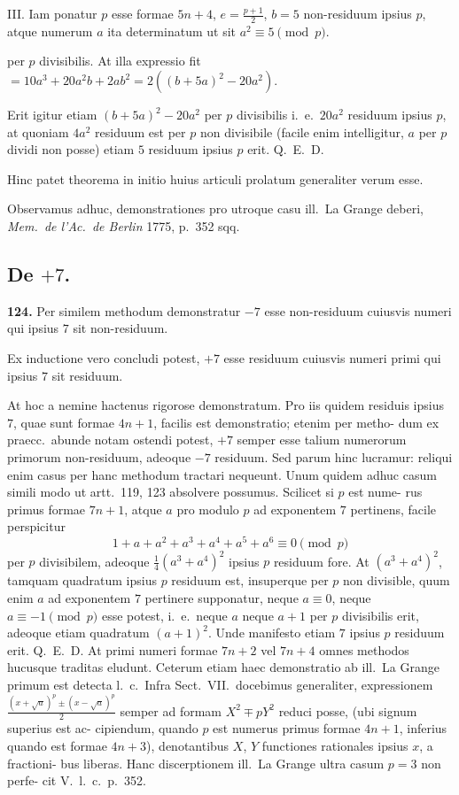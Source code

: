 \documentclass[12pt,a4paper]{article}
\begin{document}
III. Iam ponatur $p$ esse formae $5n+4$, $e = \frac{p+1}{2}$, $b = 5$ non-residuum ipsius
$p$, atque numerum $a$ ita determinatum ut sit $a^2 \equiv 5 \pmod{p}$.


per $p$ divisibilis. At illa expressio fit $= 10a^3 + 20a^2b + 2ab^2 = 2((b+5a)^2 - 20a^2)$.

Erit igitur etiam $(b+5a)^2 - 20a^2$ per $p$ divisibilis i.~e.\ $20a^2$ residuum ipsius
$p$, at quoniam $4a^2$ residuum est per $p$ non divisibile (facile enim intelligitur, $a$
per $p$ dividi non posse) etiam $5$ residuum ipsius $p$ erit. Q.~E.~D.

Hinc patet theorema in initio huius articuli prolatum generaliter verum
esse.

Observamus adhuc, demonstrationes pro utroque casu ill.\ La Grange deberi,
\textit{Mem.\ de l'Ac.\ de Berlin} 1775, p.~352 sqq.

\subsection*{De $+7$.}

\textbf{124.}
Per similem methodum demonstratur $-7$ esse non-residuum cuiusvis numeri qui ipsius $7$ sit non-residuum.

Ex inductione vero concludi potest, $+7$ esse residuum cuiusvis numeri primi qui ipsius $7$ sit residuum.

At hoc a nemine hactenus rigorose demonstratum. Pro iis quidem residuis
ipsius $7$, quae sunt formae $4n+1$, facilis est demonstratio; etenim per metho-
dum ex praecc.\ abunde notam ostendi potest, $+7$ semper esse talium numerorum
primorum non-residuum, adeoque $-7$ residuum. Sed parum hinc lucramur:
reliqui enim casus per hanc methodum tractari nequeunt. Unum quidem adhuc
casum simili modo ut artt.~119, 123 absolvere possumus. Scilicet si $p$ est nume-
rus primus formae $7n+1$, atque $a$ pro modulo $p$ ad exponentem $7$ pertinens,
facile perspicitur
\[
1 + a + a^2 + a^3 + a^4 + a^5 + a^6 \equiv 0 \pmod{p}
\]
per $p$ divisibilem, adeoque $\frac{1}{4}(a^3 + a^4)^2$ ipsius $p$ residuum fore. At $(a^3+a^4)^2$,
tamquam quadratum ipsius $p$ residuum est, insuperque per $p$ non divisible,
quum enim $a$ ad exponentem $7$ pertinere supponatur, neque $a \equiv 0$, neque
$a \equiv -1 \pmod{p}$ esse potest, i.~e.\ neque $a$ neque $a+1$ per $p$ divisibilis erit,
adeoque etiam quadratum $(a+1)^2$. Unde manifesto etiam $7$ ipsius $p$ residuum
erit. Q.~E.~D. At primi numeri formae $7n+2$ vel $7n+4$ omnes methodos
hucusque traditas eludunt. Ceterum etiam haec demonstratio ab ill.\ La Grange
primum est detecta l.~c.\ Infra Sect.~VII.\ docebimus generaliter, expressionem
$\frac{(x+\sqrt{a})^p \pm (x-\sqrt{a})^p}{2}$ semper ad formam $X^2 \mp pY^2$ reduci posse, (ubi signum superius est ac-
cipiendum, quando $p$ est numerus primus formae $4n+1$, inferius quando est
formae $4n+3$), denotantibus $X$, $Y$ functiones rationales ipsius $x$, a fractioni-
bus liberas. Hanc discerptionem ill.\ La Grange ultra casum $p=3$ non perfe-
cit V.\ l.~c.\ p.~352.
\end{document}
